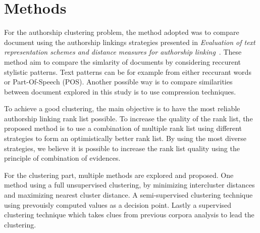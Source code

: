 \section{Methods \label{sec:methods}}

For the authorship clustering problem, the method adopted was to compare document using the authorship linkings strategies presented in \textit{Evaluation of text representation schemes and distance measures for authorship linking}~\cite{kocher_verification}.
These method aim to compare the simlarity of documents by considering reccurent stylistic patterns.
Text patterns can be for example from either reccurant words or Part-Of-Speech (POS).
Another possible way is to compare similarities between document explored in this study is to use compression techniques.

To achieve a good clustering, the main objective is to have the most reliable authorship linking rank list possible.
To increase the quality of the rank list, the proposed method is to use a combination of multiple rank list using different strategies to form an optimistically better rank list.
By using the most diverse strategies, we believe it is possible to increase the rank list quality using the principle of combination of evidences.

For the clustering part, multiple methods are explored and proposed.
One method using a full unsupervised clustering, by minimizing intercluster distances and maximizing nearest cluster distance.
A semi-supervised clustering technique using prevouisly computed values as a decision point.
Lastly a supervised clustering technique which takes clues from previous corpora analysis to lead the clustering.








